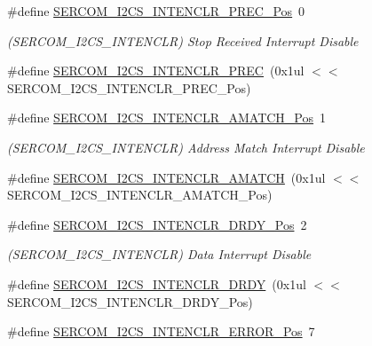 \begin{DoxyCompactItemize}
\#define \mbox{\hyperlink{group___s_a_m_d21___s_e_r_c_o_m_gad225eb6da72ff068c4b630baff60494b}{S\+E\+R\+C\+O\+M\+\_\+\+I2\+C\+S\+\_\+\+I\+N\+T\+E\+N\+C\+L\+R\+\_\+\+P\+R\+E\+C\+\_\+\+Pos}}~0
\begin{DoxyCompactList}\small\item\em (S\+E\+R\+C\+O\+M\+\_\+\+I2\+C\+S\+\_\+\+I\+N\+T\+E\+N\+C\+LR) Stop Received Interrupt Disable \end{DoxyCompactList}\item 
\#define \mbox{\hyperlink{group___s_a_m_d21___s_e_r_c_o_m_ga5dd9a890b9dc637ac07624346ec8e7b1}{S\+E\+R\+C\+O\+M\+\_\+\+I2\+C\+S\+\_\+\+I\+N\+T\+E\+N\+C\+L\+R\+\_\+\+P\+R\+EC}}~(0x1ul $<$$<$ S\+E\+R\+C\+O\+M\+\_\+\+I2\+C\+S\+\_\+\+I\+N\+T\+E\+N\+C\+L\+R\+\_\+\+P\+R\+E\+C\+\_\+\+Pos)
\item 
\#define \mbox{\hyperlink{group___s_a_m_d21___s_e_r_c_o_m_ga353ffd16a0647dace21435cd1800d1e3}{S\+E\+R\+C\+O\+M\+\_\+\+I2\+C\+S\+\_\+\+I\+N\+T\+E\+N\+C\+L\+R\+\_\+\+A\+M\+A\+T\+C\+H\+\_\+\+Pos}}~1
\begin{DoxyCompactList}\small\item\em (S\+E\+R\+C\+O\+M\+\_\+\+I2\+C\+S\+\_\+\+I\+N\+T\+E\+N\+C\+LR) Address Match Interrupt Disable \end{DoxyCompactList}\item 
\#define \mbox{\hyperlink{group___s_a_m_d21___s_e_r_c_o_m_ga1009ef23a3d5063c70c229815491cf7a}{S\+E\+R\+C\+O\+M\+\_\+\+I2\+C\+S\+\_\+\+I\+N\+T\+E\+N\+C\+L\+R\+\_\+\+A\+M\+A\+T\+CH}}~(0x1ul $<$$<$ S\+E\+R\+C\+O\+M\+\_\+\+I2\+C\+S\+\_\+\+I\+N\+T\+E\+N\+C\+L\+R\+\_\+\+A\+M\+A\+T\+C\+H\+\_\+\+Pos)
\item 
\#define \mbox{\hyperlink{group___s_a_m_d21___s_e_r_c_o_m_ga61850c98bec47e0def379c0a4133e8c7}{S\+E\+R\+C\+O\+M\+\_\+\+I2\+C\+S\+\_\+\+I\+N\+T\+E\+N\+C\+L\+R\+\_\+\+D\+R\+D\+Y\+\_\+\+Pos}}~2
\begin{DoxyCompactList}\small\item\em (S\+E\+R\+C\+O\+M\+\_\+\+I2\+C\+S\+\_\+\+I\+N\+T\+E\+N\+C\+LR) Data Interrupt Disable \end{DoxyCompactList}\item 
\#define \mbox{\hyperlink{group___s_a_m_d21___s_e_r_c_o_m_ga7f079209991a221dbe48b0a46e525e43}{S\+E\+R\+C\+O\+M\+\_\+\+I2\+C\+S\+\_\+\+I\+N\+T\+E\+N\+C\+L\+R\+\_\+\+D\+R\+DY}}~(0x1ul $<$$<$ S\+E\+R\+C\+O\+M\+\_\+\+I2\+C\+S\+\_\+\+I\+N\+T\+E\+N\+C\+L\+R\+\_\+\+D\+R\+D\+Y\+\_\+\+Pos)
\item 
\#define \mbox{\hyperlink{group___s_a_m_d21___s_e_r_c_o_m_ga7be3db9610effc27caa280fe57a021da}{S\+E\+R\+C\+O\+M\+\_\+\+I2\+C\+S\+\_\+\+I\+N\+T\+E\+N\+C\+L\+R\+\_\+\+E\+R\+R\+O\+R\+\_\+\+Pos}}~7
$$
\end{DoxyCompactItemize}
